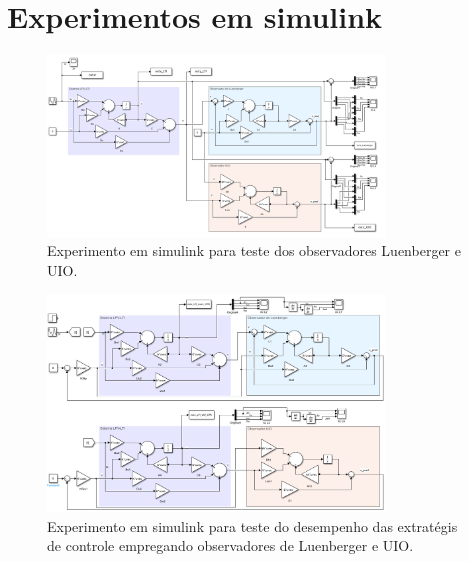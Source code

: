 \section{\\Experimentos em simulink}
\begin{figure}
    \centering
    \includegraphics[width=0.8\textwidth]{img/setup_teste_observador.png}
    \caption{Experimento em simulink para teste dos observadores Luenberger e UIO.}
    \label{fig:setup_testeobs}
\end{figure}
\begin{figure}
    \centering
    \includegraphics[width=0.8\textwidth]{img/setup_teste_controlador.png}
    \caption{Experimento em simulink para teste do desempenho das extratégis de controle empregando observadores de Luenberger e UIO.}
    \label{fig:setup_testectr}
\end{figure}
\FloatBarrier
